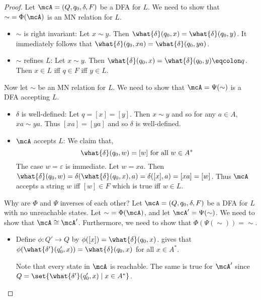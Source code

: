 \begin{proof}
    Let $\mcA = (Q, q_0, \delta, F)$ be a DFA for $L$.
    We need to show that ${\sim} = \Phi(\mcA)$ is an MN relation for $L$.
    \begin{itemize}
        \item $\sim$ is right invariant: Let $x \sim y$.
        Then $\what{\delta}(q_0, x) = \what{\delta}(q_0, y)$.
        It immediately follows that $\what{\delta}(q_0, xa) =
        \what{\delta}(q_0, ya)$.
        \item $\sim$ refines $L$: Let $x \sim y$.
        Then $\what{\delta}(q_0, x) = \what{\delta}(q_0, y) \eqcolon q$.
        Then $x \in L$ iff $q \in F$ iff $y \in L$.
    \end{itemize}
    Now let $\sim$ be an MN relation for $L$.
    We need to show that $\mcA = \Psi(\sim)$ is a DFA accepting $L$.
    \begin{itemize}
        \item $\delta$ is well-defined: Let $q = [x] = [y]$.
        Then $x \sim y$ and so for any $a \in A$, $xa \sim ya$.
        Thus $[xa] = [ya]$ and so $\delta$ is well-defined.
        \item $\mcA$ accepts $L$: We claim that, \begin{equation}
            \what{\delta}(q_0, w) = [w] \text{ for all } w \in A^*
            \label{eq:mn:dfa}
        \end{equation}
        The case $w = \varepsilon$ is immediate.
        Let $w = xa$.
        Then $\what{\delta}(q_0, w) = \delta(\what{\delta}(q_0, x), a) =
        \delta([x], a) = [xa] = [w]$.
        Thus $\mcA$ accepts a string $w$ iff $[w] \in F$ which is true iff
        $w \in L$.
    \end{itemize}
    Why are $\Phi$ and $\Psi$ inverses of each other?
    Let $\mcA = (Q, q_0, \delta, F)$ be a DFA for $L$ with no unreachable
    states.
    Let ${\sim} = \Phi(\mcA)$, and let $\mcA' = \Psi({\sim})$.
    We need to show that $\mcA \cong \mcA'$.
    Furthermore, we need to show that $\Phi(\Psi({\sim})) = {\sim}$.
    \begin{itemize}
        \item Define $\phi: Q' \to Q$ by $\phi([x]) =
        \what{\delta}(q_0, x)$.
         gives that $\phi(\what{\delta'}(q'_0, x)) =
        \what{\delta}(q_0, x)$ for all $x \in A^*$.

        Note that every state in $\mcA$ is reachable.
        The same is true for $\mcA'$ since $Q = \set{\what{\delta'}(q'_0,
        x) \mid x \in A^*}$.


\end{itemize}
\end{proof}
